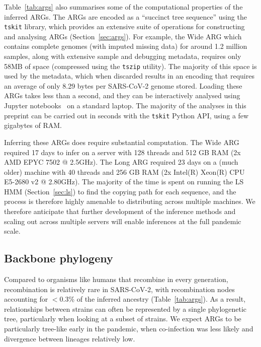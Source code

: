 \documentclass{article}
\begin{document}
Table~\ref{tab:args} also summarises some of the computational
properties of the inferred ARGs.
The ARGs are encoded as a ``succinct tree sequence'' using
the \texttt{tskit} library, which provides an extensive
suite of operations for constructing and analysing ARGs
(Section~\ref{sec:args}). For example, the Wide ARG
which contains complete genomes (with imputed missing data)
for around 1.2 million samples, along with extensive sample
and debugging metadata, requires only 58MB of space (compressed
using the \texttt{tszip} utility). The majority of this
space is used by the metadata, which when discarded results in
an encoding that requires an average of only 8.29 bytes per
SARS-CoV-2 genome stored.
Loading these ARGs takes less than a second, and they can be interactively
analysed using Jupyter notebooks~\citep{Kluyver2016-jupyter}
on a standard laptop. The majority
of the analyses in this preprint can be carried out in seconds
with the \texttt{tskit} Python API, using a few gigabytes of RAM.

Inferring these ARGs does require substantial computation.
The Wide ARG required 17 days to infer on a server with
128 threads and 512 GB RAM (2x AMD EPYC 7502 @ 2.5GHz). The Long ARG
required 23 days on a (much older) machine with 40 threads and 256 GB RAM (2x
Intel(R) Xeon(R) CPU E5-2680 v2 @ 2.80GHz). The majority of the time is spent
on running the LS HMM (Section~\ref{sec:ls}) to find the copying
path for each sequence, and the process
is therefore highly amenable to distributing across multiple machines.
We therefore anticipate that further development of the
inference methods and scaling out across multiple servers will
enable inferences at the full pandemic scale.


\subsection{Backbone phylogeny}
\label{sec:backbone_phylogeny}
Compared to organisms like humans that recombine in every generation,
recombination is relatively rare in SARS-CoV-2, with recombination nodes accounting
for $<$0.3\% of the inferred ancestry (Table~\ref{tab:args}). As a result,
relationships between strains can often be represented by a
single phylogenetic tree, particularly when looking at
a subset of strains. We expect ARGs to be particularly tree-like
early in the pandemic, when co-infection was less likely and divergence between
lineages relatively low.
\end{document}
